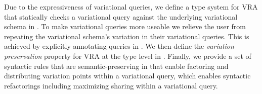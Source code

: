 Due to the expressiveness of variational queries, 
we define a type system for VRA that statically checks a
variational query against the underlying variational schema in .
%
To make variational queries more useable we relieve the user from repeating 
the variational schema's variation in their variational queries. This is achieved by 
explicitly annotating queries in .
We then define the \emph{variation-preservation} property for VRA at
the type level in .
%
Finally, we provide 
a set of syntactic rules that are semantic-preserving 
in  that enable factoring and distributing
variation points within a variational query, which enables syntactic refactorings
including maximizing sharing within a variational query.



%









